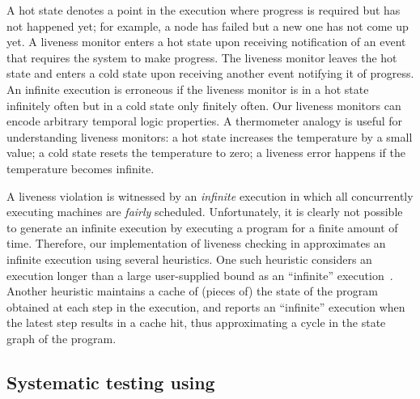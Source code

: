 A hot state denotes a point in the execution where progress is required but has not happened yet; for example, a node has failed but a new one has not come up yet. A liveness monitor enters a hot state upon receiving notification of an event that requires the system to make progress. The liveness monitor leaves the hot state and enters a cold state upon receiving another event notifying it of progress. An infinite execution is erroneous if the liveness monitor is in a hot state infinitely often but in a cold state only finitely often. Our liveness monitors can encode arbitrary temporal logic properties. A thermometer analogy is useful for understanding liveness monitors: a hot state increases the temperature by a small value; a cold state resets the temperature to zero; a liveness error happens if the temperature becomes infinite.

A liveness violation is witnessed by an \emph{infinite} execution in which all concurrently executing \psharp machines are \emph{fairly} scheduled. Unfortunately, it is clearly not possible to generate an infinite execution by executing a program for a finite amount of time. Therefore, our implementation of liveness checking in \psharp approximates an infinite execution using several heuristics. One such heuristic considers an execution longer than a large user-supplied bound as an ``infinite'' execution~\cite{killian2007life, musuvathi2008fair}. Another heuristic maintains a cache of (pieces of) the state of the \psharp program obtained at each step in the execution, and reports an ``infinite'' execution when the latest step results in a cache hit, thus approximating a cycle in the state graph of the program.


\subsection{Systematic testing using \psharp}
\label{sec:overview:testing}


